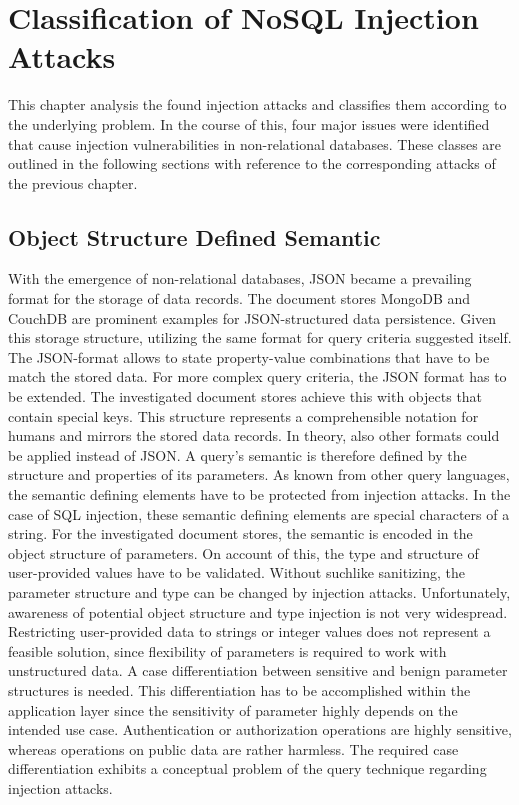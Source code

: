 \chapter{Classification of NoSQL Injection Attacks}
\label{cha:classification}
This chapter analysis the found injection attacks and classifies them according to the underlying problem. In the course of this, four major issues were identified that cause injection vulnerabilities in non-relational databases. These classes are outlined in the following sections with reference to the corresponding attacks of the previous chapter.

\section{Object Structure Defined Semantic}
With the emergence of non-relational databases, JSON became a prevailing format for the storage of data records. The document stores MongoDB and CouchDB are prominent examples for JSON-structured data persistence. Given this storage structure, utilizing the same format for query criteria suggested itself. The JSON-format allows to state property-value combinations that have to be match the stored data. For more complex query criteria, the JSON format has to be extended. The investigated document stores achieve this with objects that contain special keys. This structure represents a comprehensible notation for humans and mirrors the stored data records. In theory, also other formats could be applied instead of JSON. A query's semantic is therefore defined by the structure and properties of its parameters. As known from other query languages, the semantic defining elements have to be protected from injection attacks. In the case of SQL injection, these semantic defining elements are special characters of a string. For the investigated document stores, the semantic is encoded in the object structure of parameters. On account of this, the type and structure of user-provided values have to be validated. Without suchlike sanitizing, the parameter structure and type can be changed by injection attacks. Unfortunately, awareness of potential object structure and type injection is not very widespread. Restricting user-provided data to strings or integer values does not represent a feasible solution, since flexibility of parameters is required to work with unstructured data. A case differentiation between sensitive and benign parameter structures is needed. This differentiation has to be accomplished within the application layer since the sensitivity of parameter highly depends on the intended use case. Authentication or authorization operations are highly sensitive, whereas operations on public data are rather harmless. The required case differentiation exhibits a conceptual problem of the query technique regarding injection attacks.\\

